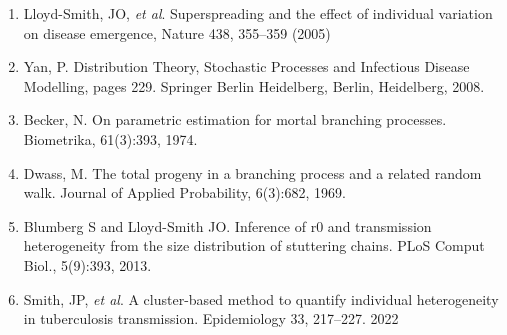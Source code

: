 \documentclass[
]{article}
\begin{document}
\begin{enumerate}
\def\labelenumi{\arabic{enumi}.}
\item
  Lloyd-Smith, JO, \emph{et al}. Superspreading and the effect of
  individual variation on disease emergence, Nature 438, 355--359 (2005)
\item
  Yan, P. Distribution Theory, Stochastic Processes and Infectious
  Disease Modelling, pages 229. Springer Berlin Heidelberg, Berlin,
  Heidelberg, 2008.
\item
  Becker, N. On parametric estimation for mortal branching processes.
  Biometrika, 61(3):393, 1974.
\item
  Dwass, M. The total progeny in a branching process and a related
  random walk. Journal of Applied Probability, 6(3):682, 1969.
\item
  Blumberg S and Lloyd-Smith JO. Inference of r0 and transmission
  heterogeneity from the size distribution of stuttering chains. PLoS
  Comput Biol., 5(9):393, 2013.
\item
  Smith, JP, \emph{et al}. A cluster-based method to quantify individual
  heterogeneity in tuberculosis transmission. Epidemiology 33, 217--227.
  2022
\end{enumerate}
\end{document}
